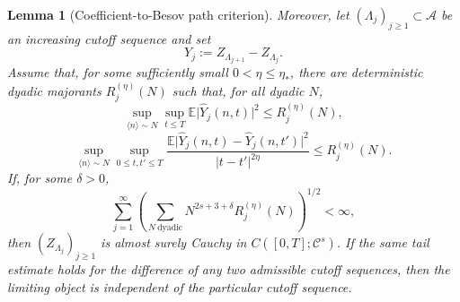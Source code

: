 \documentclass[10pt]{amsart}
\numberwithin{equation}{section}
\theoremstyle{plain}
\newtheorem{lemma}[theorem]{Lemma}
\theoremstyle{definition}
\theoremstyle{remark}
\newcommand{\E}{\mathbb{E}}
\newcommand{\C}{\mathcal{C}}
\newcommand{\la}{\langle}
\newcommand{\ra}{\rangle}
\begin{document}
\begin{lemma}[Coefficient-to-Besov path criterion]
Moreover, let \((\Lambda_j)_{j\ge1}\subset\mathcal A\) be an increasing cutoff sequence and set
\[
        Y_j:=Z_{\Lambda_{j+1}}-Z_{\Lambda_j}.
\]
Assume that, for some sufficiently small \(0<\eta\le\eta_*\), there are deterministic dyadic majorants \(R_j^{(\eta)}(N)\) such that, for all dyadic \(N\),
\begin{equation}\label{B:tail-major-fixed}
        \sup_{\la n\ra\sim N}\sup_{t\le T}
        \E\bigl|\widehat Y_j(n,t)\bigr|^2
        \le R_j^{(\eta)}(N),
\end{equation}
\begin{equation}\label{B:tail-major-incr}
        \sup_{\la n\ra\sim N}
        \sup_{0\le t,t'\le T}
        \frac{
        \E\bigl|\widehat Y_j(n,t)-\widehat Y_j(n,t')\bigr|^2
        }{|t-t'|^{2\eta}}
        \le R_j^{(\eta)}(N).
\end{equation}
If, for some \(\delta>0\),
\begin{equation}\label{B:tail-summable-criterion}
        \sum_{j=1}^\infty
        \left(
        \sum_{N\ \mathrm{dyadic}}
        N^{2s+3+\delta}R_j^{(\eta)}(N)
        \right)^{1/2}<\infty,
\end{equation}
then \((Z_{\Lambda_j})_{j\ge1}\) is almost surely Cauchy in \(C([0,T];\C^s)\).  If the same tail estimate holds for the difference of any two admissible cutoff sequences, then the limiting object is independent of the particular cutoff sequence.
\end{lemma}
\end{document}
